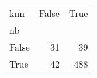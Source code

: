 \begin{tabular}{lrr}
\toprule
knn &  False &  True  \\
nb    &        &        \\
\midrule
False &     31 &     39 \\
True  &     42 &    488 \\
\bottomrule
\end{tabular}
